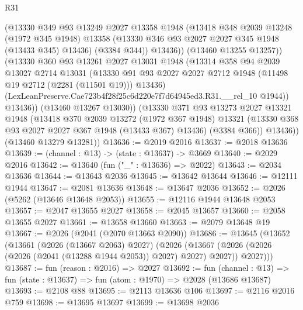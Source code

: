 \begin{lexlean}{R31}
\begin{coremodule}
                (@13330
                  @349
                  @93
                  @13249
                  @2027
                  @13358
                  @1948
                  (@13418
                    @348
                    @2039
                    @13248
                    (@1972 @345 @1948)
                    @13358
                    (@13330 @346 @93 @2027 @2027 @345 @1948 (@13433 @345) @13436)
                    (@3384 @344))
                  @13436))
              (@13460 @13255 @13257))
            (@13330
              @360
              @93
              @13261
              @2027
              @13031
              @1948
              (@13314
                @358
                @94
                @2039
                @13027
                @2714
                @13031
                (@13330
                  @91
                  @93
                  @2027
                  @2027
                  @2712
                  @1948
                  (@11498 @19 @2712 (@2281 (@11501 @19)))
                  @13436)
                (LexLeanPreserve.Cae723b4f28f25c6d220e7f7d64945ed3.R31.__rel_10 @1944))
              @13436))
          (@13460 @13267 @13030))
        (@13330
          @371
          @93
          @13273
          @2027
          @13321
          @1948
          (@13418
            @370
            @2039
            @13272
            (@1972 @367 @1948)
            @13321
            (@13330 @368 @93 @2027 @2027 @367 @1948 (@13433 @367) @13436)
            (@3384 @366))
          @13436))
      (@13460 @13279 @13281))
@13636 := @2019 @2016
@13637 := @2018 @13636
@13639 := (channel : @13) -> (state : @13637) -> @3669
@13640 := @2029 @2016
@13642 := @13640 (fun ("_" : @13636) => @2022)
@13643 := @2034 @13636
@13644 := @13643 @2036
@13645 := @13642 @13644
@13646 := @12111 @1944
@13647 := @2081 @13636
@13648 := @13647 @2036
@13652 := @2026 (@5262 (@13646 @13648 @2053))
@13655 := @12116 @1944 @13648 @2053
@13657 := @2047 @13655 @2027
@13658 := @2045 @13657
@13660 := @2058 @13655 @2027
@13661 := @13658 @13660
@13663 := @2079 @13648 @19
@13667 := @2026 (@2041 (@2070 @13663 @2090))
@13686 := @13645
    (@13652
      (@13661
        (@2026 (@13667 @2063) @2027)
        (@2026
          (@13667 (@2026 (@2026 (@2026 (@2041 (@13288 @1944 @2053)) @2027) @2027) @2027))
          @2027)))
@13687 := fun (reason : @2016) => @2027
@13692 := fun (channel : @13) => fun (state : @13637) => fun (atom : @1970) => @2028 (@13686 @13687)
@13693 := @2108 @88
@13695 := @2113 @13636 @106
@13697 := @2116 @2016 @759
@13698 := @13695 @13697
@13699 := @13698 @2036

\end{coremodule}
\end{lexlean}
